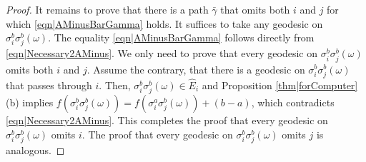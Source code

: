 \documentclass[reqno]{amsart}
\begin{document}
\begin{proof}
It remains to prove that there is a path $\bar\gamma$ that omits both $i$ and $j$ for which \eqref{eqn|AMinusBarGamma} holds. It suffices to take any geodesic on $\sigma_i^b\sigma_j^b(\omega)$. The equality \eqref{eqn|AMinusBarGamma} follows directly from \eqref{eqn|Necessary2AMinus}. We only need to prove that every geodesic on $\sigma_i^b\sigma_j^b(\omega)$ omits both $i$ and $j$. Assume the contrary, that there is a geodesic on $\sigma_i^b\sigma_j^b(\omega)$ that passes through $i$. 
Then, $\sigma_i^b\sigma_j^b(\omega)\in \hat E_i$ and Proposition \ref{thm|forComputer} (b) implies 
$f\left(\sigma_i^b\sigma_j^b(\omega)\right)=f\left(\sigma_i^a\sigma_j^b(\omega)\right)+(b-a)$, which contradicts \eqref{eqn|Necessary2AMinus}. This completes the proof that every geodesic on $\sigma_i^b\sigma_j^b(\omega)$ omits $i$. The proof that every geodesic on $\sigma_i^b\sigma_j^b(\omega)$ omits $j$ is analogous.
\end{proof}
\end{document}
